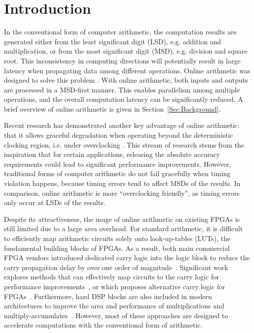 \documentclass[conference]{IEEEtran}
\begin{document}
%



\section{Introduction}\label{Sec:Intro}
In the conventional form of computer arithmetic, the computation results are generated either from the least significant digit (LSD), e.g. addition and multiplication, or from the most significant digit (MSD), e.g. division and square root. This inconsistency in computing directions will potentially result in large latency when propagating data among different operations. Online arithmetic was designed to solve this problem \cite{Ercegovac_OnlineOverview,Ercegovac_Book}. With online arithmetic, both inputs and outputs are processed in a MSD-first manner. This enables parallelism among multiple operations, and the overall computation latency can be significantly reduced. A brief overview of online arithmetic is given in Section~\ref{Sec:Background}.

Recent research has demonstrated another key advantage of online arithmetic: that it allows graceful degradation when operating beyond the deterministic clocking region, i.e. under overclocking \cite{SKDAC14_REVIEW}. This stream of research stems from the inspiration that for certain applications, releasing the absolute accuracy requirements could lead to significant performance improvements. However, traditional forms of computer arithmetic do not fail gracefully when timing violation happens, because timing errors tend to affect MSDs of the results. In comparison, online arithmetic is more ``overclocking friendly'', as timing errors only occur at LSDs of the results.

Despite its attractiveness, the usage of online arithmetic on existing FPGAs is still limited due to a large area overhead. For standard arithmetic, it is difficult to efficiently map arithmetic circuits solely onto look-up-tables (LUTs), the fundamental building blocks of FPGAs. As a result, both main commercial FPGA vendors introduced dedicated carry logic into the logic block to reduce the carry propagation delay by over one order of magnitude~\cite{Virtex6}. Significant work explores methods that can effectively map circuits to the carry logic for performance improvements~\cite{FPL10_FPGA_CarryChain,Prefix_CarryChain}, or which proposes alternative carry logic for FPGAs~\cite{FPGA_CarryChain_New1,FPGA_CarryChain_New2}. Furthermore, hard DSP blocks are also included in modern architectures to improve the area and performance of multiplications and multiply-accumulates~\cite{XilinxDSP}. However, most of these approaches are designed to accelerate computations with the conventional form of arithmetic.
\end{document}
